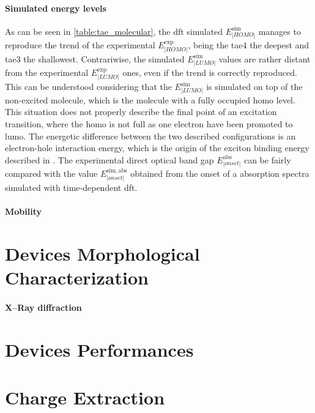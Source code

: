 \paragraph{Simulated energy levels}
As can be seen in \cref{table:tae_molecular}, the \gls{dft} simulated $E^{\mathrm{sim}}_|HOMO|$ manages to reproduce the trend of the experimental $E^{\mathrm{exp}}_|HOMO|$, being the \gls{tae4} the deepest and \gls{tae3} the shallowest.
Contrariwise, the simulated $E^{\mathrm{sim}}_|LUMO|$ values are rather distant from the experimental $E^{\mathrm{exp}}_|LUMO|$ ones, even if the trend is correctly reproduced.
This can be understood considering that the $E^{\mathrm{sim}}_|LUMO|$ is simulated on top of the non\hyp{}excited molecule, which is the molecule with a fully occupied \gls{homo} level.
This situation does not properly describe the final point of an excitation transition, where the \gls{homo} is not full as one electron have been promoted to \gls{lumo}.
The energetic difference between the two described configurations is an electron\hyp{}hole interaction energy, which is the origin of the exciton binding energy described in .
The experimental direct optical band gap \small$E^{\mathrm{abs}}_|onset|$ can be fairly compared with the value $E^{\mathrm{sim,abs}}_|onset|$ obtained from the onset of a absorption spectra simulated with time\hyp{}dependent \gls{dft}.

\paragraph{Mobility}


\section{Devices Morphological Characterization}

\paragraph{X--Ray diffraction}


\section{Devices Performances}

\paragraph{}

\section{Charge Extraction}

